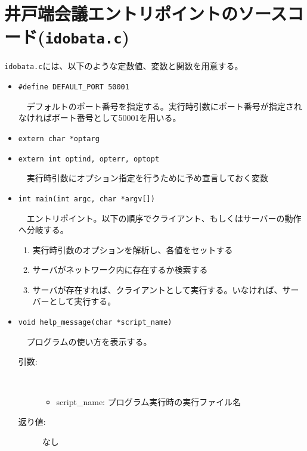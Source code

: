 \documentclass[uplatex,dvipdfmx,11pt,a4paper]{jsarticle} %
\begin{document}
\section{井戸端会議エントリポイントのソースコード({\tt idobata.c})}
{\tt idobata.c}には、以下のような定数値、変数と関数を用意する。


\begin{itemize}
    \item {\tt \#define DEFAULT\_PORT 50001}

        　デフォルトのポート番号を指定する。実行時引数にポート番号が指定されなければポート番号として50001を用いる。
        \newline

    \item {\tt extern char *optarg}
    \item {\tt extern int optind, opterr, optopt}

        　実行時引数にオプション指定を行うために予め宣言しておく変数
        \newline

    \item{\tt int main(int argc, char *argv[])}

        　エントリポイント。以下の順序でクライアント、もしくはサーバーの動作へ分岐する。
        \begin{enumerate}
            \item 実行時引数のオプションを解析し、各値をセットする
            \item サーバがネットワーク内に存在するか検索する
            \item サーバが存在すれば、クライアントとして実行する。いなければ、サーバーとして実行する。
            \newline
        \end{enumerate}

    \item {\tt void help\_message(char *script\_name)}

        　プログラムの使い方を表示する。
        \begin{description}
            \item[引数:] \ 

                \begin{itemize}
                    \item script\_name: プログラム実行時の実行ファイル名
                \end{itemize}
            \item[返り値:] なし
        \end{description}
\end{itemize}
\end{document}
